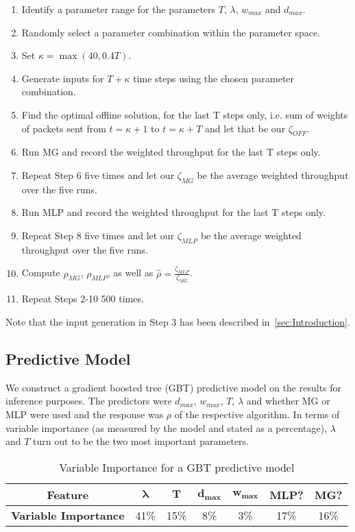 \documentclass[oribibl]{llncs}
\begin{document}
\begin {enumerate}
\item Identify a parameter range for the parameters $T$, $\lambda$, $w_{max}$ and $d_{max}$.
\item Randomly select a parameter combination within the parameter space. 
\item Set $\kappa=\max(40, 0.4T)$. 
\item Generate inputs for $T+\kappa$ time steps using the chosen parameter combination.
\item Find the optimal offline solution, for the last T steps only, i.e. sum of weights of packets sent from $t=\kappa+1$ to $t=\kappa+T$ and let that be our $\zeta_{OFF}$.

\item Run MG and record the weighted throughput for the last T steps only.
\item Repeat Step 6 five times and let our $\zeta_{MG}$ be the average weighted throughput over the five runs.

\item Run MLP and record the weighted throughput for the last T steps only.
\item Repeat Step 8 five times and let our $\zeta_{MLP}$ be the average weighted throughput over the five runs.

\item Compute $\rho_{MG}$, $\rho_{MLP}$, as well as $\hat{\rho}=\frac{\zeta_{MLP}}{ \zeta_{MG}}$.
\item Repeat Steps 2-10 500 times.
\end{enumerate}

Note that the input generation in Step 3 has been described in~\ref{sec:Introduction}.


\subsection{Predictive Model}
\label{app:predM}
We construct a gradient boosted tree (GBT) predictive model on the results for inference purposes. The predictors were $d_{max}$, $w_{max}$, $T$, $\lambda$ and whether MG or MLP were used and the response was $\rho$ of the respective algorithm. In terms of variable importance (as measured by the model and stated as a percentage), $\lambda$ and $T$ turn out to be the two most important parameters.

\vspace{-13pt}
\begin{table}
\centering
 \begin{tabular}{|c || c c c c | c c|} 
 \hline
 \textbf{Feature} & $\mathbf{\lambda}$ & $\mathbf{T}$ &  $\mathbf{d_{max}}$ & $\mathbf{w_{max}}$ & \textbf{MLP?} & \textbf{MG?} \\
 \hline
 \textbf{Variable Importance}& 41\%  & 15\% & 8\%& 3\% & 17\% & 16\%\\  
  \hline

\end{tabular}
 \caption{Variable Importance for a GBT predictive model}
\end{table}
\end{document}

